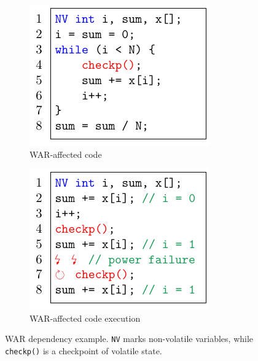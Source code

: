 \begin{figure}
    \begin{subfigure}{0.49\columnwidth}
        \includegraphics[width=\columnwidth]{figures/war-example.pdf}
        \caption{WAR-affected code}
        \label{fig:war-example}
    \end{subfigure}
    \begin{subfigure}{0.49\columnwidth}
        \includegraphics[width=\columnwidth]{figures/war-execution.pdf}
        \caption{WAR-affected code execution}
        \label{fig:war-execution}
    \end{subfigure}
    \caption{WAR dependency example. \texttt{NV} marks non-volatile variables, while \texttt{checkp()} is a checkpoint of volatile state.  }
    \label{fig:war}
\end{figure}

